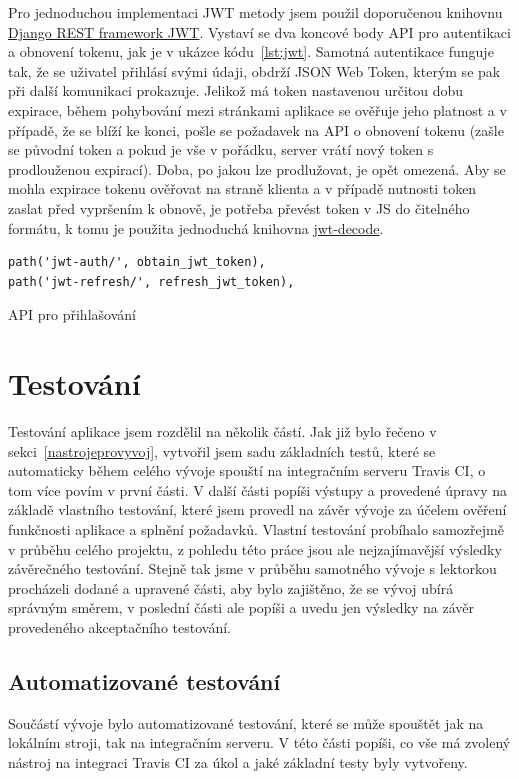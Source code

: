     Pro jednoduchou implementaci JWT metody jsem použil doporučenou knihovnu \href{http://getblimp.github.io/django-rest-framework-jwt/}{Django REST framework JWT}. Vystaví se dva koncové body API pro autentikaci a obnovení tokenu, jak je v ukázce kódu~\ref{lst:jwt}. Samotná autentikace funguje tak, že se uživatel přihlásí svými údaji, obdrží JSON Web Token, kterým se pak při další komunikaci prokazuje. Jelikož má token nastavenou určitou dobu expirace, během pohybování mezi stránkami aplikace se ověřuje jeho platnost a v případě, že se blíží ke konci, pošle se požadavek na API o obnovení tokenu (zašle se původní token a pokud je vše v pořádku, server vrátí nový token s prodlouženou expirací). Doba, po jakou lze prodlužovat, je opět omezená. Aby se mohla expirace tokenu ověřovat na straně klienta a v případě nutnosti token zaslat před vypršením k obnově, je potřeba převést token v JS do čitelného formátu, k tomu je použita jednoduchá knihovna \href{https://github.com/auth0/jwt-decode}{jwt-decode}.
    
    \begin{listing}[ht]
    	\begin{verbatim}
path('jwt-auth/', obtain_jwt_token),
path('jwt-refresh/', refresh_jwt_token),
    	\end{verbatim}
    	\caption{API pro přihlašování}\label{lst:jwt}
    \end{listing}

    
\chapter{Testování}\label{testovani}
    Testování aplikace jsem rozdělil na několik částí. Jak již bylo řečeno v sekci~\ref{nastrojeprovyvoj}, vytvořil jsem sadu základních testů, které se automaticky během celého vývoje spouští na integračním serveru Travis CI, o tom více povím v první části. V další části popíši výstupy a provedené úpravy na základě vlastního testování, které jsem provedl na závěr vývoje za účelem ověření funkčnosti aplikace a splnění požadavků. Vlastní testování probíhalo samozřejmě v průběhu celého projektu, z pohledu této práce jsou ale nejzajímavější výsledky závěrečného testování. Stejně tak jsme v průběhu samotného vývoje s lektorkou procházeli dodané a upravené části, aby bylo zajištěno, že se vývoj ubírá správným směrem, v poslední části ale popíši a uvedu jen výsledky na závěr provedeného akceptačního testování. 

    \section{Automatizované testování}\label{sec:automatizovaneTestovani}
    Součástí vývoje bylo automatizované testování, které se může spouštět jak na lokálním stroji, tak na integračním serveru. V této části popíši, co vše má zvolený nástroj na integraci Travis CI za úkol a jaké základní testy byly vytvořeny.
    
